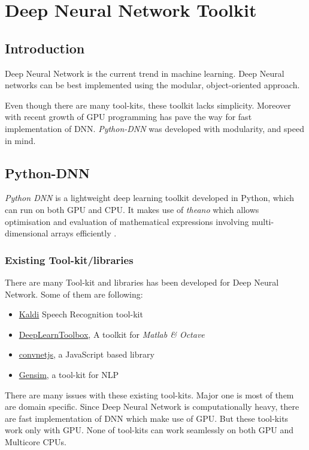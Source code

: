 \chapter{Deep Neural Network Toolkit} 
\label{chap:toolkit}
\section{Introduction}
Deep Neural Network is the current trend
in machine learning. Deep Neural networks can be best implemented using the modular, object-oriented approach. 

Even though there are many tool-kits, these toolkit lacks simplicity. Moreover with recent growth of GPU programming has pave the way for fast implementation of DNN. \textit{Python-DNN} was developed with modularity, and speed in mind.

\section{Python-DNN}
\textit{Python DNN} is a lightweight deep learning toolkit developed in Python, which can run on both GPU and CPU. It makes use of \emph{theano} which allows optimisation and evaluation of mathematical expressions involving multi-dimensional arrays efficiently \cite{bergstra2010theano}.

\subsection{Existing Tool-kit/libraries}
There are many Tool-kit and libraries has been developed for Deep Neural Network. Some of them are following: 
\begin{itemize}
\item \href{http://kaldi.sourceforge.net/}{Kaldi} Speech Recognition tool-kit
\item \href{https://github.com/rasmusbergpalm/DeepLearnToolbox}{DeepLearnToolbox}, A toolkit for \textit{Matlab \& Octave}
\item \href{http://cs.stanford.edu/people/karpathy/convnetjs/}{convnetjs}, a JavaScript based library
\item \href{https://radimrehurek.com/gensim}{Gensim}, a tool-kit for NLP
\end{itemize}

There are many issues with these existing tool-kits. Major one is most of them are domain specific. Since Deep Neural Network is computationally heavy, there are fast implementation of DNN which make use of GPU. But these tool-kits work only with GPU. None of tool-kits can work seamlessly on both GPU and Multicore CPUs. 

